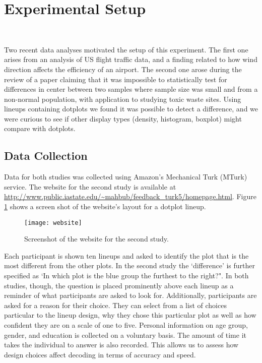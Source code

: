 \section{Experimental Setup}~\label{setup}

Two recent data analyses motivated the setup of this experiment. The first one arises from an analysis of US flight traffic data, and a finding related to how wind direction affects the efficiency of an airport.  The second one arose during the review of a paper claiming that it was impossible to statistically test for differences in center between two samples where sample size was small and from a non-normal population, with application to studying toxic waste sites. Using lineups containing dotplots we found it was possible to detect a difference, and we were curious to see if other display types (density, histogram, boxplot) might compare with dotplots.


\subsection{Data Collection}
Data for both studies was collected using Amazon's Mechanical Turk (MTurk) service. 
The website for the second study is available at \url{http://www.public.iastate.edu/~mahbub/feedback_turk5/homepage.html}. Figure \ref{fig:screen} shows a screen shot of the website's layout for a dotplot lineup.

\begin{figure}[htbp] %
   \centering
   \texttt{[image: website]} 
   \caption{Screenshot of the website for the second study. }
   \label{fig:screen}
\end{figure}

Each participant is shown ten lineups and asked to identify the plot that is the most different from the other plots. In the second study the `difference' is further specified as `In which plot is the blue group the furthest to the right?". 
 In both studies, though, the question is placed prominently above each lineup as a reminder of what participants are asked to look for.  Additionally, participants are asked for a reason for their choice. They can select from a list of choices particular to the lineup design, why they chose this particular plot as well as how confident they are on a scale of one to five. Personal information on age group, gender, and education is collected on a voluntary basis.  The amount of time it takes the individual to answer is also recorded.  This  allows us to assess how design choices affect decoding \cite{cleveland:1994} in terms of accuracy and speed.
 
